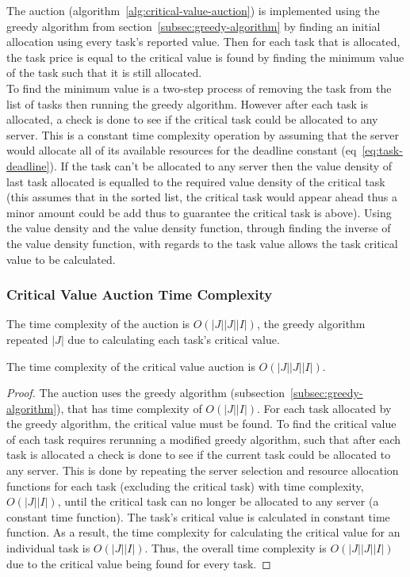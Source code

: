 The auction (algorithm~\ref{alg:critical-value-auction}) is implemented using the greedy algorithm from
section~\ref{subsec:greedy-algorithm} by finding an initial allocation using every task's reported value. Then for
each task that is allocated, the task price is equal to the critical value is found by finding the minimum value of the
task such that it is still allocated. \\
To find the minimum value is a two-step process of removing the task from the list of tasks then running the greedy
algorithm. However after each task is allocated, a check is done to see if the critical task could be allocated to any
server. This is a constant time complexity operation by assuming that the server would allocate all of its available
resources for the deadline constant (eq~\ref{eq:task-deadline}). If the task can't be allocated to any server then the
value density of last task allocated is equalled to the required value density of the critical task (this assumes that
in the sorted list, the critical task would appear ahead thus a minor amount could be add thus to guarantee the
critical task is above). Using the value density and the value density function, through finding the inverse of the
value density function, with regards to the task value allows the task critical value to be calculated.

\subsubsection{Critical Value Auction Time Complexity}
\label{subsubsec:critical-value-auction-time-complexity}
The time complexity of the auction is $O(\left|J\right| \left|J\right| \left|I\right|)$, the greedy
algorithm repeated $\left|J\right|$ due to calculating each task's critical value.
\begin{theorem}
    The time complexity of the critical value auction is $O(\left|J\right| \left|J\right| \left|I\right|)$.
\end{theorem}
\begin{proof}
    The auction uses the greedy algorithm (subsection~\ref{subsec:greedy-algorithm}), that has time complexity of
    $O(\left|J\right| \left|I\right|)$. For each task allocated by the greedy algorithm, the critical value must be
    found. To find the critical value of each task requires rerunning a modified greedy algorithm, such that after each
    task is allocated a check is done to see if the current task could be allocated to any server. This is done by
    repeating the server selection and resource allocation functions for each task (excluding the critical task) with
    time complexity, $O(\left|J\right| \left|I\right|)$, until the critical task can no longer be allocated to any
    server (a constant time function). The task's critical value is calculated in constant time function. As a result,
    the time complexity for calculating the critical value for an individual task is $O(\left|J\right| \left|I\right|)$.
    Thus, the overall time complexity is $O(\left|J\right| \left|J\right| \left|I\right|)$ due to the critical value
    being found for every task.
\end{proof}

